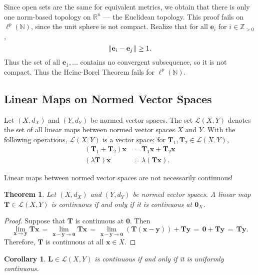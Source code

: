 \documentclass[11pt]{article}
\newtheorem{theorem}{Theorem}
\newtheorem{corollary}{Corollary}
\renewcommand{\vec}[1]{\mathbf{#1}}
\newcommand{\mat}[1]{\mathbf{#1}}
\begin{document}
Since open sets are the same for equivalent metrics, we obtain that there is only one norm-based topology on $\mathbb{R}^{n}$ --- the Euclidean topology. This proof fails on $\ell^{p}(\mathbb{N})$, since the unit sphere is not compact. Realize that for all $\vec{e}_{i}$ for $i \in \mathbb{Z}_{> 0}$,
\[
  \norm{\vec{e}_{i} - \vec{e}_{j}} \ge 1.
\]
Thus the set of all $\vec{e}_{1}, \ldots$ contains no convergent subsequence, so it is not compact. Thus the Heine-Borel Theorem fails for $\ell^{p}(\mathbb{N})$.


\subsection{Linear Maps on Normed Vector Spaces}

Let $(X, d_{X})$ and $(Y, d_{Y})$ be normed vector spaces. The set $\mathcal{L}(X, Y)$ denotes the set of all linear maps between normed vector spaces $X$ and $Y$. With the following operations, $\mathcal{L}(X, Y)$ is a vector space: for $\mat{T}_{1}, \mat{T}_{2} \in \mathcal{L}(X, Y)$,
\begin{align*}
  (\mat{T}_{1} + \mat{T}_{2})\vec{x} &= \mat{T}_{1} \vec{x} + \mat{T}_{2} \vec{x} \\
           (\lambda \mat{T}) \vec{x} &= \lambda (\mat{T} \vec{x}).
\end{align*}

Linear maps between normed vector spaces are not necessarily continuous!

\newpage

\begin{theorem}
  Let $(X, d_{X})$ and $(Y, d_{Y})$ be normed vector spaces. A linear map $\mat{T} \in \mathcal{L}(X, Y)$ is continuous if and only if it is continuous at $\vec{0}_{X}$.
\end{theorem}
\begin{adjustwidth}{0.5cm}{}
  \begin{proof}
    Suppose that $\mat{T}$ is continuous at $\vec{0}$. Then
    \[
      \lim\limits_{\vec{x} \to \vec{y}} \mat{T} \vec{x} \, = \,  \lim\limits_{\vec{x} - \vec{y} \to \vec{0}} \mat{T} \vec{x} \, = \, \lim\limits_{\vec{x} - \vec{y} \to \vec{0}} (\mat{T}(\vec{x} - \vec{y})) + \mat{T} \vec{y} \, = \, \vec{0} + \mat{T}\vec{y} \, = \, \mat{T} \vec{y}.
    \]
    Therefore, $\mat{T}$ is continuous at all $\vec{x} \in X$.
  \end{proof}
\end{adjustwidth}
\begin{corollary}
  $\mat{L} \in \mathcal{L}(X, Y)$ is continuous if and only if it is uniformly continuous.
\end{corollary}
\end{document}
